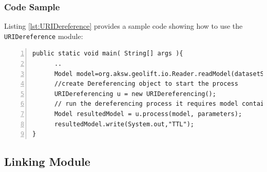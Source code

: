\documentclass[a4paper,twoside,bibtotoc,abstracton,12pt,BCOR=15mm]{article}
\begin{document}
\subsubsection{Code Sample}
Listing \ref{lst:URIDereference} provides a sample code showing how to use the \texttt{URIDereference} module:\\

\begin{lstlisting}[label=lst:URIDereference, numbers=left, numberstyle=\tiny, caption = Code fragment to call the \texttt{URIDereferencing} class.]
public static void main( String[] args ){
      ..
      Model model=org.aksw.geolift.io.Reader.readModel(datasetSource);//First parameter: model is loaded with dataset from specified file/endpoint
      //create Dereferencing object to start the process
      URIDereferencing u = new URIDereferencing();
      // run the dereferencing process it requires model contains the dataset and list of targeted predicates to enrich the model
      Model resultedModel = u.process(model, parameters);
      resultedModel.write(System.out,"TTL");
}

\end{lstlisting}


\subsection{Linking Module}
\end{document}
